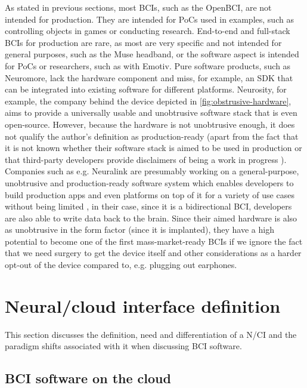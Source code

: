 As stated in previous sections, most BCIs, such as the OpenBCI, are not intended for production. They are intended for PoCs used in examples, such as controlling objects in games or conducting research. End-to-end and full-stack BCIs for production are rare, as most are very specific and not intended for general purposes, such as the Muse headband, or the software aspect is intended for PoCs or researchers, such as with Emotiv. Pure software products, such as Neuromore, lack the hardware component and miss, for example, an SDK that can be integrated into existing software for different platforms. Neurosity, for example, the company behind the device depicted in \autoref{fig:obstrusive-hardware}, aims to provide a universally usable and unobtrusive software stack that is even open-source. However, because the hardware is not unobtrusive enough, it does not qualify the author's definition as production-ready (apart from the fact that it is not known whether their software stack is aimed to be used in production \citep{neurosity_neurosity_2022} or that third-party developers provide disclaimers of being a work in progress \citep{turney_notion_2022}). Companies such as e.g. Neuralink are presumably working on a general-purpose, unobtrusive and production-ready software system which enables developers to build production apps and even platforms on top of it for a variety of use cases without being limited \citep{musk_integrated_2019}, in their case, since it is a bidirectional BCI, developers are also able to write data back to the brain. Since their aimed hardware is also as unobtrusive in the form factor (since it is implanted), they have a high potential to become one of the first mass-market-ready BCIs if we ignore the fact that we need surgery to get the device itself \citep{neuralink_approach_nodate} and other considerations as a harder opt-out of the device compared to, e.g. plugging out earphones.

\section{Neural/cloud interface definition}
\label{chapter2-neural-cloud-interface-definition}

This section discusses the definition, need and differentiation of a N/CI and the paradigm shifts associated with it when discussing BCI software.

\subsection{BCI software on the cloud}
\label{chapter2-bci-software-on-the-cloud}

